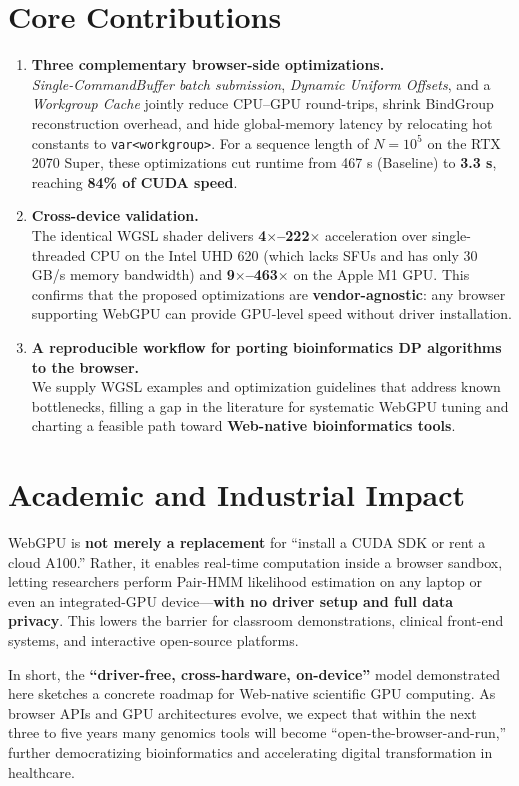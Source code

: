 \documentclass[12pt]{report}
\begin{document}
\section{Core Contributions}
\begin{enumerate}
    \item \textbf{Three complementary browser-side optimizations.} \\
    \emph{Single-CommandBuffer batch submission}, \emph{Dynamic Uniform Offsets}, and a \emph{Workgroup Cache} jointly reduce CPU–GPU round-trips, shrink BindGroup reconstruction overhead, and hide global-memory latency by relocating hot constants to \texttt{var<workgroup>}. For a sequence length of $N=10^5$ on the RTX 2070 Super, these optimizations cut runtime from 467 s (Baseline) to \textbf{3.3 s}, reaching \textbf{84\% of CUDA speed}.
    \item \textbf{Cross-device validation.} \\
    The identical WGSL shader delivers \textbf{4$\times$–222$\times$} acceleration over single-threaded CPU on the Intel UHD 620 (which lacks SFUs and has only 30 GB/s memory bandwidth) and \textbf{9$\times$–463$\times$} on the Apple M1 GPU. This confirms that the proposed optimizations are \textbf{vendor-agnostic}: any browser supporting WebGPU can provide GPU-level speed without driver installation.
    \item \textbf{A reproducible workflow for porting bioinformatics DP algorithms to the browser.} \\
    We supply WGSL examples and optimization guidelines that address known bottlenecks, filling a gap in the literature for systematic WebGPU tuning and charting a feasible path toward \textbf{Web-native bioinformatics tools}.
\end{enumerate}

\section{Academic and Industrial Impact}
WebGPU is \textbf{not merely a replacement} for ``install a CUDA SDK or rent a cloud A100.'' Rather, it enables real-time computation inside a browser sandbox, letting researchers perform Pair-HMM likelihood estimation on any laptop or even an integrated-GPU device—\textbf{with no driver setup and full data privacy}. This lowers the barrier for classroom demonstrations, clinical front-end systems, and interactive open-source platforms.

In short, the \textbf{``driver-free, cross-hardware, on-device''} model demonstrated here sketches a concrete roadmap for Web-native scientific GPU computing. As browser APIs and GPU architectures evolve, we expect that within the next three to five years many genomics tools will become ``open-the-browser-and-run,'' further democratizing bioinformatics and accelerating digital transformation in healthcare.
\end{document}
